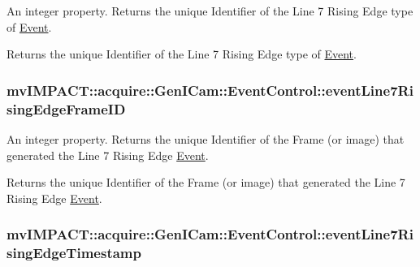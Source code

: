 An integer property. Returns the unique Identifier of the Line 7 Rising Edge type of \hyperlink{classmv_i_m_p_a_c_t_1_1acquire_1_1_event}{Event}. 

Returns the unique Identifier of the Line 7 Rising Edge type of \hyperlink{classmv_i_m_p_a_c_t_1_1acquire_1_1_event}{Event}. \hypertarget{classmv_i_m_p_a_c_t_1_1acquire_1_1_gen_i_cam_1_1_event_control_ad8290c93a720b70d441eb4511a950ac0}{
\subsubsection[{event\+Line7\+Rising\+Edge\+Frame\+I\+D}]{ mv\+I\+M\+P\+A\+C\+T\+::acquire\+::\+Gen\+I\+Cam\+::\+Event\+Control\+::event\+Line7\+Rising\+Edge\+Frame\+I\+D}}\label{classmv_i_m_p_a_c_t_1_1acquire_1_1_gen_i_cam_1_1_event_control_ad8290c93a720b70d441eb4511a950ac0}


An integer property. Returns the unique Identifier of the Frame (or image) that generated the Line 7 Rising Edge \hyperlink{classmv_i_m_p_a_c_t_1_1acquire_1_1_event}{Event}. 

Returns the unique Identifier of the Frame (or image) that generated the Line 7 Rising Edge \hyperlink{classmv_i_m_p_a_c_t_1_1acquire_1_1_event}{Event}. \hypertarget{classmv_i_m_p_a_c_t_1_1acquire_1_1_gen_i_cam_1_1_event_control_a38d382452b1e1050943e527fd87769ea}{
\subsubsection[{event\+Line7\+Rising\+Edge\+Timestamp}]{ mv\+I\+M\+P\+A\+C\+T\+::acquire\+::\+Gen\+I\+Cam\+::\+Event\+Control\+::event\+Line7\+Rising\+Edge\+Timestamp}}\label{classmv_i_m_p_a_c_t_1_1acquire_1_1_gen_i_cam_1_1_event_control_a38d382452b1e1050943e527fd87769ea}


